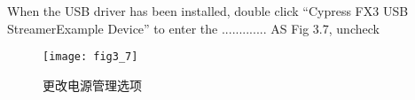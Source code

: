 When the USB driver has been installed, double click “Cypress FX3 USB StreamerExample Device” to enter the ............. AS Fig 3.7, uncheck 
\begin{figure}[htbp]
\centering
\texttt{[image: fig3\_7]}
\caption{更改电源管理选项}
\end{figure}




